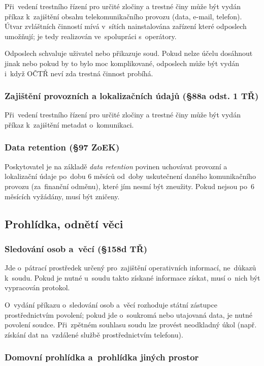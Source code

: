 Při~vedení trestního řízení pro určité zločiny a trestné činy může být vydán příkaz k~zajištění obsahu telekomunikačního provozu (data, e-mail, telefon).
Útvar zvláštních činností mívá v~sítích nainstalována zařízení které odposlech umožňují; je tedy realizován ve~spolupráci s~operátory.

Odposlech schvaluje uživatel nebo přikazuje soud.
Pokud nelze účelu dosáhnout jinak nebo pokud by to bylo moc komplikované, odposlech může být vydán i~když OČTŘ neví zda trestná činnost probíhá.


\subsubsection{Zajištění provozních a lokalizačních údajů (§88a odst. 1 TŘ)}

Při~vedení trestního řízení pro určité zločiny a trestné činy může být vydán příkaz k~zajištění metadat o~komunikaci.

\subsubsection{Data retention (§97 ZoEK)}

Poskytovatel je na základě \emph{data retention} povinen uchovávat provozní a lokalizační údaje po~dobu 6 měsíců od~doby uskutečnení daného komunikačního provozu (za~finanční odměnu), které jím nesmí být zneužity.
Pokud nejsou po~6 měsících vyžádány, musí být zničeny.


\subsection{Prohlídka, odnětí věci}

\subsubsection{Sledování osob a~věcí (§158d TŘ)}

Jde o~pátrací prostředek určený pro~zajištění operativních informací, ne~důkazů k~soudu.
Pokud je nutné u~soudu takto získané informace získat, musí o~nich být vypracován protokol.

O~vydání příkazu o~sledování osob a~věcí rozhoduje státní zástupce prostřednictvím povolení; pokud jde o~soukromá nebo utajovaná data, je nutné povolení soudce.
Při~zpětném souhlasu soudu lze provést neodkladný úkol (např. získání dat na~vzdálené službě prostřednictvím telefonu).

\subsubsection{Domovní prohlídka a~prohlídka jiných prostor}

